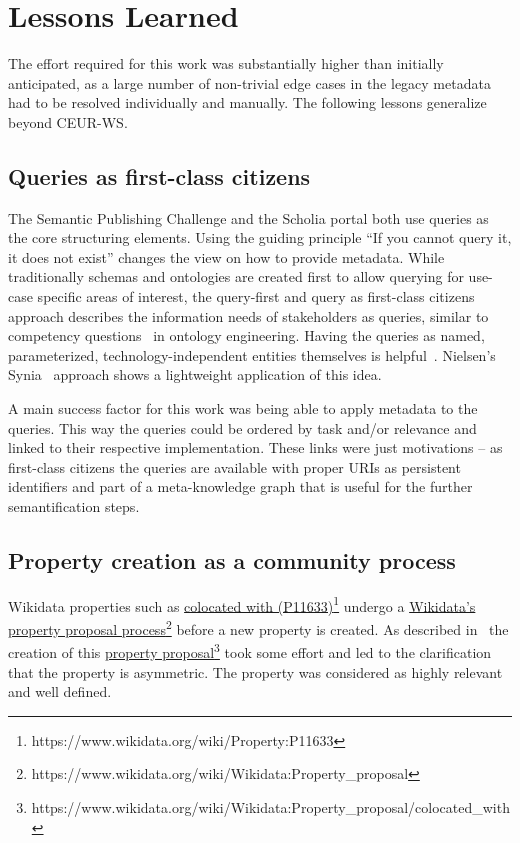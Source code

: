 \documentclass[runningheads]{llncs}
\newcommand{\tquote}[1]{``#1''}
\newcommand{\footnotelink}[2]{\href{#1}{#2}\footnote{#1}}
\newcommand{\wdp}[2]{\footnotelink{https://www.wikidata.org/wiki/Property:#2}{#1 (#2)}}
\begin{document}
\section{Lessons Learned}\label{sec:LessonsLearned}
The effort required for this work was substantially higher than initially anticipated, as a large number of non-trivial edge cases in the legacy metadata had to be resolved individually and manually.
The following lessons generalize beyond CEUR-WS.

\subsection{Queries as first-class citizens}
The Semantic Publishing Challenge and the Scholia portal both use queries as the core structuring elements. Using the guiding principle \tquote{If you cannot query it, it does not exist} changes the view on how to provide metadata. While traditionally schemas and ontologies are created first to allow querying for use-case specific areas of interest, the query-first and query as first-class citizens approach describes the information needs of stakeholders as queries, similar to competency questions~\cite{Uschold1996-xt} in ontology engineering. Having the queries as named, parameterized, technology-independent entities themselves is helpful~\cite{snapquery}. Nielsen's Synia~\cite{NielsenSynia2023} approach shows a lightweight application of this idea.

A main success factor for this work was being able to apply metadata to the queries. This way the queries could be ordered by task and/or relevance and linked to their respective implementation. These links were just motivations -- as first-class citizens the queries are available with proper URIs as persistent identifiers and part of a meta-knowledge graph that is useful for the further semantification steps.  
\subsection{Property creation as a community process}
Wikidata properties such as \wdp{colocated with}{P11633} undergo a \footnotelink{https://www.wikidata.org/wiki/Wikidata:Property\_proposal}{Wikidata's property proposal process} before a new property is created. As described in~\cite{FahlHOD23} the creation of this \footnotelink{https://www.wikidata.org/wiki/Wikidata:Property\_proposal/colocated\_with}{property proposal} took some effort and led to the clarification that the property is asymmetric. The property was considered as highly relevant and well defined.
\end{document}
